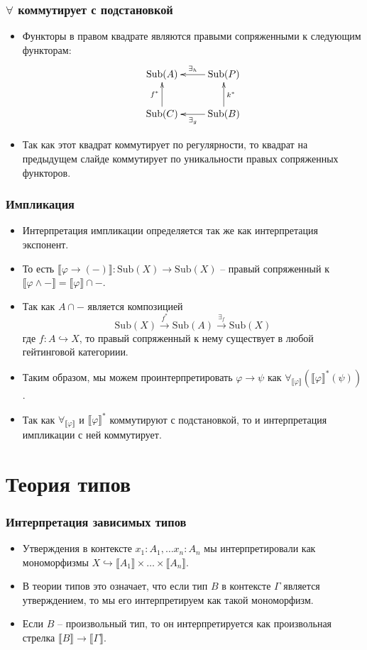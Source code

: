 \documentclass{beamer}
\theoremstyle{definition}
\renewcommand{\ll}{\llbracket}
\newcommand{\rr}{\rrbracket}
\newcommand{\fs}[1]{\mathrm{#1}}
\newcommand{\Sub}{\fs{Sub}}
\begin{document}
\begin{frame}
\frametitle{$\forall$ коммутирует с подстановкой}
\begin{itemize}
\item Функторы в правом квадрате являются правыми сопряженными к следующим функторам:
\[ \xymatrix{ \Sub(A)              & \Sub(P) \ar[l]_{\exists_h} \\
              \Sub(C) \ar[u]^{f^*} & \Sub(B) \ar[l]^{\exists_g} \ar[u]_{k^*} 
            } \]
\item Так как этот квадрат коммутирует по регулярности, то квадрат на предыдущем слайде коммутирует по уникальности правых сопряженных функторов.
\end{itemize}
\end{frame}

\begin{frame}
\frametitle{Импликация}
\begin{itemize}
\item Интерпретация импликации определяется так же как интерпретация экспонент.
\item То есть $\ll \varphi \to (-) \rr : \Sub(X) \to \Sub(X)$ -- правый сопряженный к $\ll \varphi \land - \rr = \ll \varphi \rr \cap -$.
\item Так как $A \cap -$ является композицией
\[ \Sub(X) \xrightarrow{f^*} \Sub(A) \xrightarrow{\exists_f} \Sub(X) \]
где $f : A \hookrightarrow X$, то правый сопряженный к нему существует в любой гейтинговой категориии.
\item Таким образом, мы можем проинтерпретировать $\varphi \to \psi$ как $\forall_{\ll \varphi \rr} (\ll \varphi \rr^*(\psi))$.
\item Так как $\forall_{\ll \varphi \rr}$ и $\ll \varphi \rr^*$ коммутируют с подстановкой, то и интерпретация импликации с ней коммутирует.
\end{itemize}
\end{frame}

\section{Теория типов}

\begin{frame}
\frametitle{Интерпретация зависимых типов}
\begin{itemize}
\item Утверждения в контексте $x_1 : A_1, \ldots x_n : A_n$ мы интерпретировали как мономорфизмы $X \hookrightarrow \ll A_1 \rr \times \ldots \times \ll A_n \rr$.
\item В теории типов это означает, что если тип $B$ в контексте $\Gamma$ является утверждением, то мы его интерпретируем как такой мономорфизм.
\item Если $B$ -- произвольный тип, то он интерпретируется как произвольная стрелка $\ll B \rr \to \ll \Gamma \rr$.
\end{itemize}
\end{frame}
\end{document}

